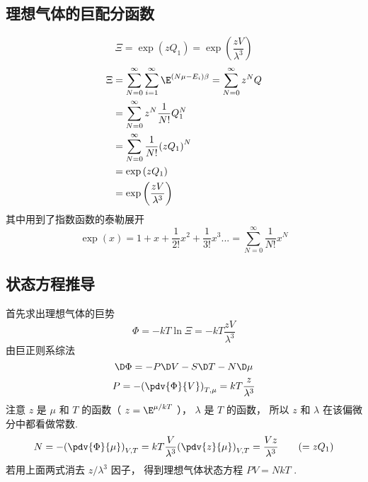 
\subsection{理想气体的巨配分函数}
\noindent{}
\begin{equation}\label{IdMCE_eq1}
\Xi  = \exp \left( {z{Q_1}} \right) = \exp \left( {\frac{{zV}}{{{\lambda ^3}}}} \right)
\end{equation}
\begin{equation}\label{IdMCE_eq2}
\begin{aligned}
\Xi & = \sum\limits_{N = 0}^\infty  {\sum\limits_{i = 1}^\infty  {{\E^{\left( {N\mu  - {E_i}} \right)\beta }}} }  = \sum\limits_{N = 0}^\infty  {{z^N}Q} \\
& = \sum\limits_{N = 0}^\infty  {{z^N}\frac{1}{{N!}}Q_1^N} \\
& = \sum\limits_{N = 0}^\infty  {\frac{1}{{N!}}{{\left( {z{Q_1}} \right)}^N}} \\
& = \exp \left( {z{Q_1}} \right) \\
& = \exp \left( {\frac{{zV}}{{{\lambda ^3}}}} \right){\kern 1pt} {\kern 1pt} {\kern 1pt} {\kern 1pt} {\kern 1pt} {\kern 1pt} {\kern 1pt}
\end{aligned}
\end{equation}
其中用到了指数函数的泰勒展开%
\begin{equation}\label{IdMCE_eq3}
\exp \left( x \right) = 1 + x + \frac{1}{{2!}}{x^2} + \frac{1}{{3!}}{x^3}... = \sum\limits_{N = 0}^\infty  {\frac{1}{{N!}}{x^N}}
\end{equation}

\subsection{状态方程推导}
首先求出理想气体的巨势
\begin{equation}\label{IdMCE_eq4}
\Phi  =  - kT\ln \Xi  =  - kT\frac{{zV}}{{{\lambda ^3}}}
\end{equation}
由巨正则系综法%
\begin{equation}\label{IdMCE_eq5}
\D \Phi  =  - P \D V - S \D T - N \D \mu
\end{equation}
\begin{equation}\label{IdMCE_eq6}
P =  - {\left( {\pdv{\Phi}{V}} \right)_{T,\mu }} = kT\frac{z}{{{\lambda ^3}}}
\end{equation}
注意 $z$ 是 $\mu $ 和 $T$ 的函数（ $z = {\E^{{\mu }/{{kT}}}}$ ）， $\lambda $ 是 $T$ 的函数， 所以 $z$ 和 $\lambda $ 在该偏微分中都看做常数.
\begin{equation}\label{IdMCE_eq7}
N =  - {\left( {\pdv{\Phi}{\mu}} \right)_{V,T}} = kT\frac{V}{{{\lambda ^3}}}{\left( {\pdv{z}{\mu}} \right)_{V,T}} = \frac{{Vz}}{{{\lambda ^3}}} 
\qquad
( = z{Q_1})
\end{equation}
若用上面两式消去 ${z}/{{{\lambda ^3}}}$ 因子， 得到理想气体状态方程 $PV = NkT$ .
  
